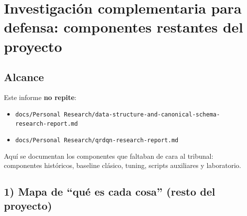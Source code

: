 ﻿\documentclass[12pt,a4paper]{article}
\begin{document}
\section{Investigación complementaria para defensa: componentes restantes del proyecto}

\subsection{Alcance}

Este informe \textbf{no repite}:

\begin{itemize}
  \item \verb|docs/Personal Research/data-structure-and-canonical-schema-research-report.md|
  \item \verb|docs/Personal Research/qrdqn-research-report.md|
\end{itemize}

Aquí se documentan los componentes que faltaban de cara al tribunal: componentes históricos,
baseline clásico, tuning, scripts auxiliares y laboratorio.

\subsection{1) Mapa de ``qué es cada cosa'' (resto del proyecto)}
\end{document}
